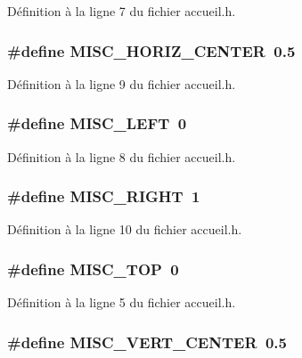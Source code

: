 Définition à la ligne 7 du fichier accueil.h.

\subsubsection[{MISC\_\-HORIZ\_\-CENTER}]{\setlength{\rightskip}{0pt plus 5cm}\#define MISC\_\-HORIZ\_\-CENTER~0.5}\label{accueil_8h_a3d325ba2da49b499255c87336707464b}


Définition à la ligne 9 du fichier accueil.h.

\subsubsection[{MISC\_\-LEFT}]{\setlength{\rightskip}{0pt plus 5cm}\#define MISC\_\-LEFT~0}\label{accueil_8h_a96ebd4d8c7cedbf81511c4dfac6bf735}


Définition à la ligne 8 du fichier accueil.h.

\subsubsection[{MISC\_\-RIGHT}]{\setlength{\rightskip}{0pt plus 5cm}\#define MISC\_\-RIGHT~1}\label{accueil_8h_a72c2eb88c2171b68f4bb2c423f1341cf}


Définition à la ligne 10 du fichier accueil.h.

\subsubsection[{MISC\_\-TOP}]{\setlength{\rightskip}{0pt plus 5cm}\#define MISC\_\-TOP~0}\label{accueil_8h_ae04931da25763d87bc4ae6b8bada02d0}


Définition à la ligne 5 du fichier accueil.h.

\subsubsection[{MISC\_\-VERT\_\-CENTER}]{\setlength{\rightskip}{0pt plus 5cm}\#define MISC\_\-VERT\_\-CENTER~0.5}\label{accueil_8h_a8bf487a203e78cbc9e7ce30034a600f9}


